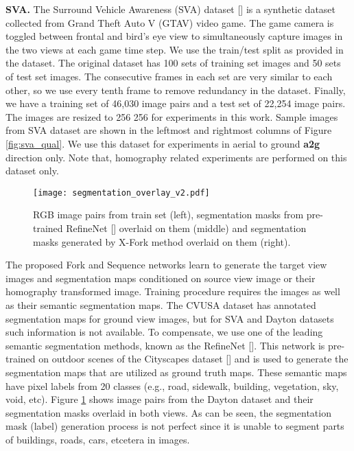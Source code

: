 \documentclass[times,twocolumn,final,authoryear]{elsarticle_modified}
\begin{document}
\noindent \textbf{SVA.} The Surround Vehicle Awareness (SVA) dataset [\cite{10.1007/978-3-319-68560-1_21}] is a synthetic dataset collected from Grand Theft Auto V (GTAV) video game. The game camera is toggled between frontal and bird's eye view to simultaneously capture images in the two views at each game time step. We use the train/test split as provided in the dataset. The original dataset has 100 sets of training set images and 50 sets of test set images. The consecutive frames in each set are very similar to each other, so we use every tenth frame to remove redundancy in the dataset. Finally, we have a training set of 46,030 image pairs and a test set of 22,254 image pairs. The images are resized to 256  256 for experiments in this work. Sample images from SVA dataset are shown in the leftmost and rightmost columns of Figure \ref{fig:sva_qual}. We use this dataset for experiments in aerial to ground \textbf{a2g} direction only. Note that, homography related experiments are performed on this dataset only. 



\begin{figure}
\centering
\texttt{[image: segmentation\_overlay\_v2.pdf]}
\vspace{-5pt}
\caption{\small \label{fig:overlay}RGB image pairs from train set (left), segmentation masks from pre-trained RefineNet [\cite{Lin:2017:RefineNet}] overlaid on them (middle) and segmentation masks generated by X-Fork method overlaid on them (right).}
  \vspace{-15pt}
\end{figure}


The proposed Fork and Sequence networks learn to generate the target view images and segmentation maps conditioned on source view image or their homography transformed image. Training procedure requires the images as well as their semantic segmentation maps. The CVUSA dataset has annotated segmentation maps for ground view images, but for SVA and Dayton datasets such information is not available. To compensate, we use one of the leading semantic segmentation methods, known as the RefineNet [\cite{Lin:2017:RefineNet}]. This network is pre-trained on outdoor scenes of the Cityscapes dataset [\cite{Cordts2016Cityscapes}] and is used to generate the segmentation maps that are utilized as ground truth maps. These semantic maps have pixel labels from 20 classes (e.g., road, sidewalk, building, vegetation, sky, void, etc). Figure \ref{fig:overlay} shows image pairs from the Dayton dataset and their segmentation masks overlaid in both views. As can be seen, the segmentation mask (label) generation process is not perfect since it is unable to segment parts of buildings, roads, cars, etcetera in images.
\end{document}

